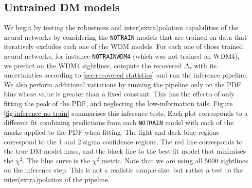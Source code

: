 \subsection{Untrained DM models}
We begin by testing the robustness and inter(extra)polation capabilities of the neural networks by considering the \texttt{NOTRAIN} models that are trained on data that iteratively excludes each one of the WDM models. For each one of those trained neural networks, for instance \texttt{NOTRAINWDM4} (which was not trained on WDM4), we predict on the WDM4 sightlines, compute the recovered $\Delta_\tau$ with its uncertainties according to \ref{sec:recovered statistics} and run the inference pipeline. We also perform additional variations by running the pipeline only on the PDF bins whose value is greater than a fixed constant. This has the effecto of only fitting the peak of the PDF, and neglecting the low-information tails. Figure \ref{fig:inference no train} summarises this inference tests. Each plot corresponds to a different fit combining predictions from each \texttt{NOTRAIN} model with each of the masks applied to the PDF when fitting. The light and dark blue regions correspond to the 1 and 2 sigma confidence regions. The red line corresponds to the true DM model mass, and the black line to the best-fit model that minimises the $\chi^2$. The blue curve is the $\chi^2$ metric. Note that we are using all 5000 sightlines on the inference step. This is not a realistic sample size, but rather a test to the inter(extra)polation of the pipeline.


